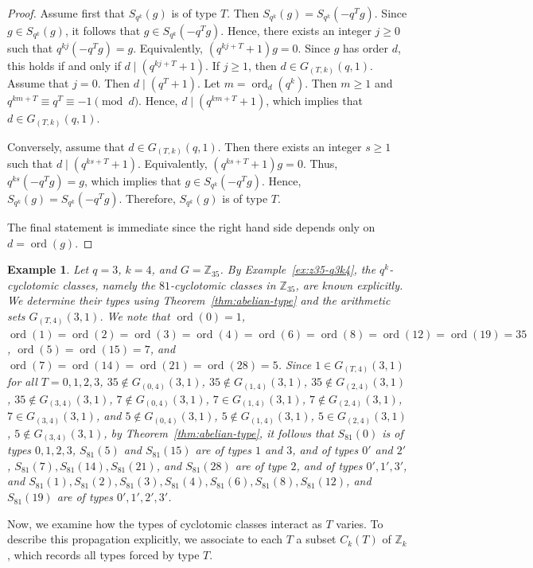 \documentclass[pdflatex,sn-mathphys-num]{sn-jnl}%
\theoremstyle{thmstyleone}%
\theoremstyle{thmstyletwo}%
\newtheorem{example}{Example}%
\theoremstyle{thmstylethree}%
\newcommand{\Z}{\mathbb{Z}}
\newcommand{\ord}{\operatorname{ord}}
\begin{document}
\begin{proof}
Assume first that $S_{q^k}(g)$ is of type $T$. Then
$
S_{q^k}(g)=S_{q^k}(-q^Tg)$.
Since $g\in S_{q^k}(g)$, it follows that
$
g\in S_{q^k}(-q^Tg).
$
Hence,  there exists an integer $j\ge 0$ such that
$
q^{kj}(-q^Tg)=g$.
Equivalently, $
(q^{kj+T}+1)g=0$.
Since $g$ has order $d$, this holds if and only if $
d\mid (q^{kj+T}+1)$.
If $j\ge 1$, then $
d\in G_{(T,k)}(q,1)$. Assume that $j=0$. Then $
d\mid (q^T+1)$.
Let $m=\ord_d(q^k)$. Then $m\ge 1$ and
$
q^{km+T}\equiv q^T\equiv -1\pmod d$.
Hence, 
$
d\mid (q^{km+T}+1)$,
which implies that $
d\in G_{(T,k)}(q,1)$.

Conversely, assume that $
d\in G_{(T,k)}(q,1)$.
Then there exists an integer $s\ge 1$ such  that $
d\mid (q^{ks+T}+1)$.
Equivalently,
$
(q^{ks+T}+1)g=0$.
Thus, $
q^{ks}(-q^Tg)=g$,
which implies  that
$
g\in S_{q^k}(-q^Tg)$.
Hence,  $
S_{q^k}(g)=S_{q^k}(-q^Tg)$.
Therefore, $S_{q^k}(g)$ is of type $T$.

The final statement is immediate since the right hand side depends only on $d=\ord(g)$.
\end{proof}

\begin{example}
Let $q=3$, $k=4$, and $G=\Z_{35}$. By Example~\ref{ex:z35-q3k4}, the $q^k$-cyclotomic classes, namely the $81$-cyclotomic classes in $\Z_{35}$, are known explicitly. We  determine their types using Theorem~\ref{thm:abelian-type} and the arithmetic sets $G_{(T,4)}(3,1)$. We note that  $
\ord(0)=1$, $
\ord(1)=\ord(2)=\ord(3)=\ord(4)=\ord(6)=\ord(8)=\ord(12)=\ord(19)=35$, $
\ord(5)=\ord(15)=7$,
and
$
\ord(7)=\ord(14)=\ord(21)=\ord(28)=5$.
Since 
$
1\in G_{(T,4)}(3,1)$ for all $T=0,1,2,3$, 
$35\notin G_{(0,4)}(3,1)$,
$35\notin G_{(1,4)}(3,1)$,
$35\notin G_{(2,4)}(3,1)$,
$35\notin G_{(3,4)}(3,1)$,
$7\notin G_{(0,4)}(3,1)$,
$7\in G_{(1,4)}(3,1)$, 
$7\notin G_{(2,4)}(3,1)$,
$7\in G_{(3,4)}(3,1)$,
and
$
5\notin G_{(0,4)}(3,1)$,
$5\notin G_{(1,4)}(3,1)$,
$5\in G_{(2,4)}(3,1)$,
$5\notin G_{(3,4)}(3,1)$,  by Theorem~\ref{thm:abelian-type},  it follows that  
$
S_{81}(0)$
is of types $0,1,2,3$, 
$
S_{81}(5)$ and  $ S_{81}(15)$
are of types $1$ and $3$, and of types $0'$ and $2'$, 
$
S_{81}(7), S_{81}(14), S_{81}(21)$, and $S_{81}(28)
$
are of type $2$, and of types $0',1',3'$,  and
$
S_{81}(1), S_{81}(2), S_{81}(3), S_{81}(4), S_{81}(6), S_{81}(8), S_{81}(12)$, and $S_{81}(19)
$
are of types $0',1',2',3'$.
\end{example}

 Now, we  examine how the types of cyclotomic classes interact as $T$ varies. To describe this propagation explicitly, we associate to each $T$ a subset $C_k(T)$ of $\Z_k$, which records all types forced by type $T$.
\end{document}
